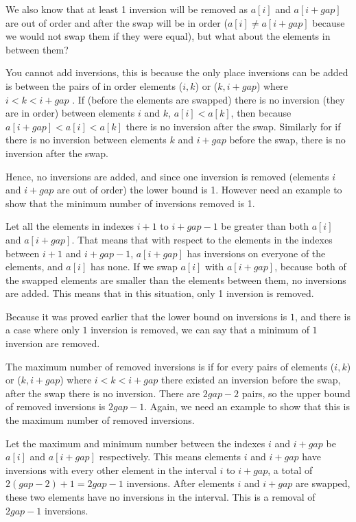 \documentclass{article}
\begin{document}
We also know that at least 1 inversion will be removed as \(a[i]\) and \(a[i+gap]\) are out of order and after the swap will be in order (\(a[i] \neq a[i+gap]\) because we would not swap them if they were equal), but what about the elements in between them?

You cannot add inversions, this is because the only place inversions can be added is between the pairs of in order elements (\(i,k\)) or (\(k,i+gap\)) where \(i < k < i+gap\) . If (before the elements are swapped) there is no inversion (they are in order) between elements \(i\) and \(k\), \(a[i] < a[k]\), then because \(a[i+gap] < a[i] < a[k]\) there is no inversion after the swap. Similarly for if there is no inversion between elements \(k\) and \(i+gap\) before the swap, there is no inversion after the swap.

Hence, no inversions are added, and since one inversion is removed (elements \(i\) and \(i+gap\) are out of order) the lower bound is 1. However need an example to show that the minimum number of inversions removed is 1.  

Let all the elements in indexes \(i+1\) to \(i+gap-1\) be greater than both \(a[i]\) and \(a[i+gap]\). That means that with respect to the elements in the indexes between \(i+1\) and \(i+gap-1\), \(a[i+gap]\) has inversions on everyone of the elements, and \(a[i]\) has none. If we swap \(a[i]\) with \(a[i+gap]\), because both of the swapped elements are smaller than the elements between them, no inversions are added. This means that in this situation, only 1 inversion is removed.

Because it was proved earlier that the lower bound on inversions is \(1\), and there is a case where only \(1\) inversion is removed, we can say that a minimum of \(1\) inversion are removed.

The maximum number of removed inversions is if for every pairs of elements (\(i,k\)) or (\(k,i+gap\)) where \(i < k < i+gap\) there existed an inversion before the swap, after the swap there is no inversion. There are \(2gap-2\) pairs, so the upper bound of removed inversions is \(2gap-1\). Again, we need an example to show that this is the maximum number of removed inversions.

Let the maximum and minimum number between the indexes \(i\) and \(i+gap\) be \(a[i]\) and \(a[i+gap]\) respectively. This means elements \(i\) and \(i+gap\) have inversions with every other element in the interval \(i\) to \(i+gap\), a total of \(2(gap-2)+1=2gap-1\) inversions. After elements \(i\) and \(i+gap\) are swapped, these two elements have no inversions in the interval. This is a removal of \(2gap-1\) inversions.
\end{document}
